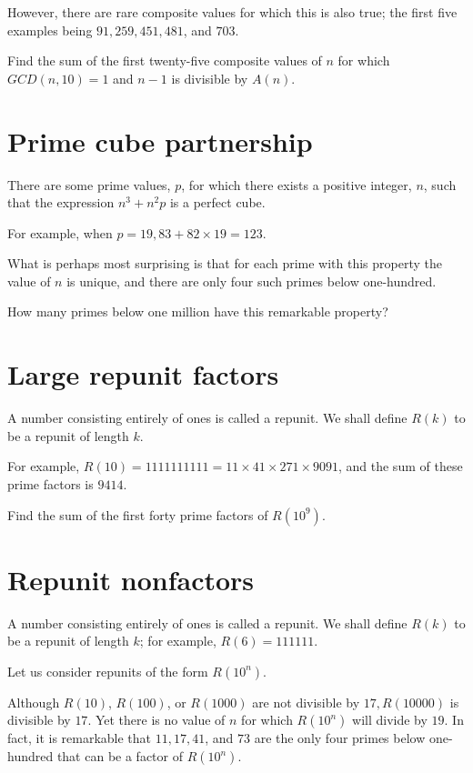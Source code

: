 However, there are rare composite values for which this is also true; the first five examples being $91, 259, 451, 481$, and $703$.

Find the sum of the first twenty-five composite values of $n$ for which
$GCD(n, 10) = 1$ and $n - 1$ is divisible by $A(n)$.


\section{Prime cube partnership} \label{pb.0131}

There are some prime values, $p$, for which there exists a positive integer, $n$, such that the expression $n^3 + n^2p$ is a perfect cube.

For example, when $p = 19, 83 + 82 \times 19 = 123$.

What is perhaps most surprising is that for each prime with this property the value of $n$ is unique, and there are only four such primes below one-hundred.
\medskip

How many primes below one million have this remarkable property?


\section{Large repunit factors} \label{pb.0132}

A number consisting entirely of ones is called a repunit. We shall define $R(k)$ to be a repunit of length $k$.

For example, $R(10) = 1111111111 = 11 \times 41 \times 271 \times 9091$, and the sum of these prime factors is $9414$.
\medskip

Find the sum of the first forty prime factors of $R(10^9)$.


\section{Repunit nonfactors} \label{pb.0133}

A number consisting entirely of ones is called a repunit. We shall define $R(k)$ to be a repunit of length $k$; for example, $R(6) = 111111$.

Let us consider repunits of the form $R(10^n)$.

Although $R(10)$, $R(100)$, or $R(1000)$ are not divisible by $17, R(10000)$ is divisible by $17$. Yet there is no value of $n$ for which $R(10^n)$ will divide by $19$. In fact, it is remarkable that $11, 17, 41$, and $73$ are the only four primes below one-hundred that can be a factor of $R(10^n)$.
\medskip

